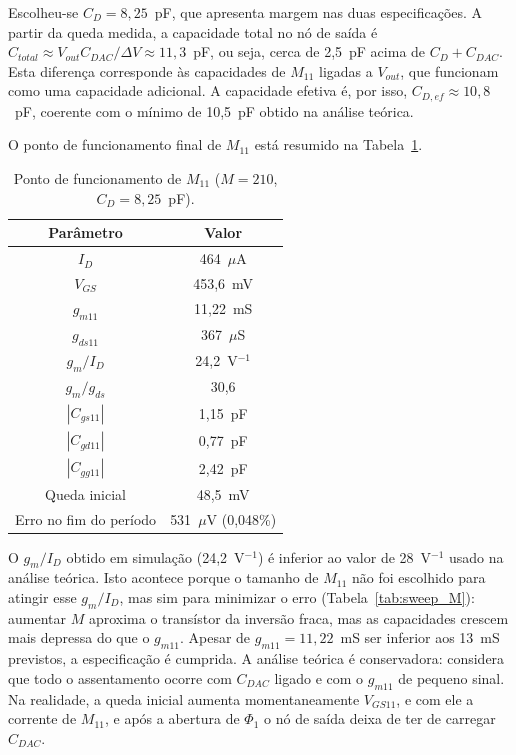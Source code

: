 Escolheu-se $C_D = 8{,}25$~pF, que apresenta margem nas duas especificações. A partir da queda medida, a capacidade total no nó de saída é $C_{total}
\approx V_{out}C_{DAC}/\Delta V \approx 11{,}3$~pF, ou seja, cerca de 2,5~pF acima de $C_D + C_{DAC}$. Esta diferença corresponde às capacidades de $M_{11}$
ligadas a $V_{out}$, que funcionam como uma capacidade adicional. A capacidade efetiva é, por isso, $C_{D,ef} \approx 10{,}8$~pF, coerente com o mínimo de
10,5~pF obtido na análise teórica.

O ponto de funcionamento final de $M_{11}$ está resumido na Tabela~\ref{tab:op_m11}.

\begin{table}[H]
    \centering
    \caption{Ponto de funcionamento de $M_{11}$ ($M = 210$, $C_D = 8{,}25$~pF).}
    \label{tab:op_m11}
    \begin{tabular}{cc}
        \toprule
        Parâmetro & Valor \\
        \midrule
        $I_D$ & 464~$\mu$A \\
        $V_{GS}$ & 453,6~mV \\
        $g_{m11}$ & 11,22~mS \\
        $g_{ds11}$ & 367~$\mu$S \\
        $g_m/I_D$ & 24,2~V$^{-1}$ \\
        $g_m/g_{ds}$ & 30,6 \\
        $|C_{gs11}|$ & 1,15~pF \\
        $|C_{gd11}|$ & 0,77~pF \\
        $|C_{gg11}|$ & 2,42~pF \\
        Queda inicial & 48,5~mV \\
        Erro no fim do período & 531~$\mu$V (0,048\%) \\
        \bottomrule
    \end{tabular}
\end{table}

O $g_m/I_D$ obtido em simulação (24,2~V$^{-1}$) é inferior ao valor de 28~V$^{-1}$ usado na análise teórica.
Isto acontece porque o tamanho de $M_{11}$ não foi escolhido para atingir esse $g_m/I_D$, mas sim para minimizar o erro
(Tabela~\ref{tab:sweep_M}): aumentar $M$ aproxima o transístor da inversão fraca, mas as capacidades crescem mais depressa
do que o $g_{m11}$. Apesar de $g_{m11} = 11{,}22$~mS ser inferior aos 13~mS previstos,
a especificação é cumprida. A análise teórica é conservadora: considera que todo o assentamento ocorre com $C_{DAC}$ ligado
e com o $g_{m11}$ de pequeno sinal. Na realidade, a queda inicial aumenta momentaneamente $V_{GS11}$, e com ele a corrente
de $M_{11}$, e após a abertura de $\Phi_1$ o nó de saída deixa de ter de carregar $C_{DAC}$.

